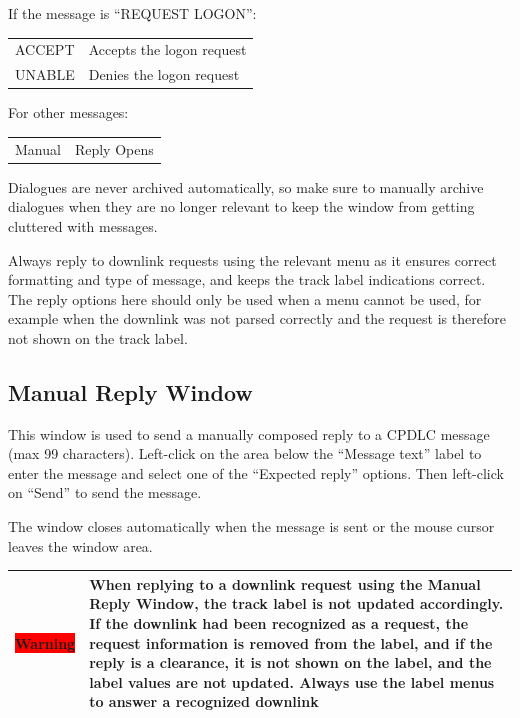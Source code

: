 \documentclass[a4paper,oneside,11pt]{memoir}
\newcommand{\winref}[1]{\textit{\titleref{#1}}}
\newcommand{\warn}[1]{
  \begin{center}
    
    \begin{tabular}{| P{1.5cm}|p{10.5cm} |}
      \hline
      \cellcolor{shadecolor}\colorbox{red}{\color{white}Warning} &\cellcolor{shadecolor} #1 \\ \hline
    \end{tabular}
  \end{center}
}
\begin{document}
\bigskip

If the message is “REQUEST LOGON”:

\begin{longtable}{p{2.5cm} p{10cm}}
    ACCEPT & Accepts the logon request\\
    UNABLE & Denies the logon request\\
\end{longtable}

\bigskip

For other messages:

\begin{longtable}{p{2.5cm} p{10cm}}
    Manual & Reply Opens \winref{win:dlmrw}\\
\end{longtable}

\bigskip

Dialogues are never archived automatically, so make sure to manually archive dialogues when they are no longer relevant to keep the window from getting cluttered with messages.

\bigskip

Always reply to downlink requests using the relevant menu as it ensures correct formatting and type of message, and keeps the track label indications correct. The reply options here should only be used when a menu cannot be used, for example when the downlink was not parsed correctly and the request is therefore not shown on the track label.

\subsection{Manual Reply Window}
\label{win:dlmrw}

This window is used to send a manually composed reply to a CPDLC message (max 99 characters). Left-click on the area below the “Message text” label to enter the message and select one of the “Expected reply” options. Then left-click on “Send” to send the message.

\bigskip

The window closes automatically when the message is sent or the mouse cursor leaves the window area.

\warn{  When replying to a downlink request using the Manual Reply Window, the track label is not updated accordingly. If the downlink had been recognized as a request, the request information is removed from the label, and if the reply is a clearance, it is not shown on the label, and the label values are not updated. Always use the label menus to answer a recognized downlink}
\end{document}
